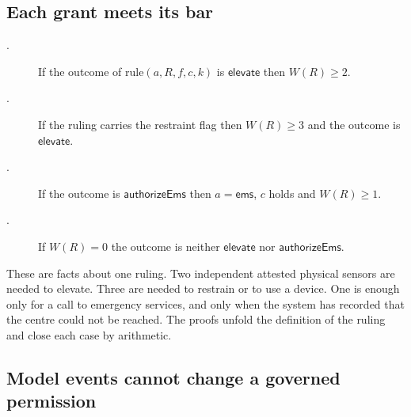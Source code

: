 \subsection{Each grant meets its bar}

\begin{description}
  \item[.] If the outcome of $\mathrm{rule}(a, R, f, c, k)$ is
  $\mathsf{elevate}$ then $W(R) \ge 2$.
  \item[.] If the ruling carries the restraint flag then
  $W(R) \ge 3$ and the outcome is $\mathsf{elevate}$.
  \item[.] If the outcome is
  $\mathsf{authorizeEms}$ then $a = \mathsf{ems}$, $c$ holds and $W(R) \ge 1$.
  \item[.] If $W(R) = 0$ the outcome is neither
  $\mathsf{elevate}$ nor $\mathsf{authorizeEms}$.
\end{description}
These are facts about one ruling.
Two independent attested physical sensors are needed to elevate.
Three are needed to restrain or to use a device.
One is enough only for a call to emergency services, and only when the system has recorded that
the centre could not be reached.
The proofs unfold the definition of the ruling and close each case by arithmetic.

\subsection{Model events cannot change a governed permission}


